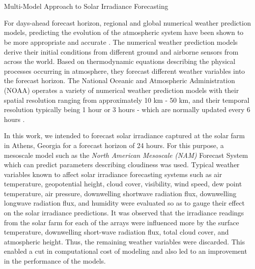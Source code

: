 \chapter{}{Multi-Model Approach to Solar Irradiance Forecasting}

For days-ahead forecast horizon, regional and global numerical weather prediction models, predicting the evolution of the atmospheric system have been shown to be more appropriate and accurate \cite{thesis_zach}. The numerical weather prediction models derive their initial conditions from different ground and airborne sensors from across the world. Based on thermodynamic equations describing the physical processes occurring in atmosphere, they forecast different weather variables into the forecast horizon. The National Oceanic and Atmospheric Administration (NOAA) operates a variety of numerical weather prediction models with their spatial resolution ranging from approximately 10 km - 50 km, and their temporal resolution typically being 1 hour or 3 hours -  which are normally updated every 6 hours \cite{multimodel_bestpractices}. 

\par In this work, we intended to forecast solar irradiance captured at the solar farm in Athens, Georgia for a forecast horizon of 24 hours. For this purpose, a mesoscale model such as the \textit{North American Mesoscale (NAM)} Forecast System \cite{multimodel_nam} which can predict parameters describing cloudiness was used. Typical weather variables known to affect solar irradiance forecasting systems such as air temperature, geopotential height, cloud cover, visibility, wind speed, dew point temperature, air pressure, downwelling shortwave radiation flux, downwelling longwave radiation flux, and humidity were evaluated so as to gauge their effect on the solar irradiance predictions. It was observed that the irradiance readings from the solar farm for each of the arrays were influenced more by the surface temperature, downwelling short-wave radiation flux, total cloud cover, and atmospheric height. Thus, the remaining weather variables were discarded. This enabled a cut in computational cost of modeling and also led to an improvement in the performance of the models.

\restoregeometry

